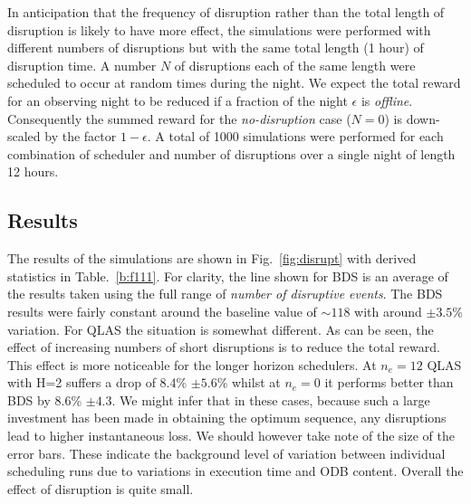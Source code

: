 In anticipation that the frequency of disruption rather than the total length of disruption is likely to have more effect, the simulations were performed with different numbers of disruptions but with the same total length (1 hour) of disruption time. A number $N$ of disruptions each of the same length were scheduled to occur at random times during the night. We expect the total reward for an observing night to be reduced if a fraction of the night $\epsilon$ is \emph{offline}. Consequently the summed reward for the \emph{no-disruption} case ($N = 0$) is down-scaled by the factor $1-\epsilon$. A total of 1000 simulations were performed for each combination of scheduler and number of disruptions over a single night of length 12 hours.

\subsection{Results}
The results of the simulations are shown in Fig.~\ref{fig:disrupt} with derived statistics in Table.~\ref{b:f111}. For clarity, the line shown for BDS is an average of the results taken using the full range of \emph{number of disruptive events}. The BDS results were fairly constant around the baseline value of $\sim 118$ with around $\pm 3.5$\% variation. For QLAS the situation is somewhat different. As can be seen, the effect of increasing numbers of short disruptions is to reduce the total reward. This effect is more noticeable for the longer horizon schedulers. At $n_e=12$ QLAS with H=2 suffers a drop of 8.4\% $\pm 5.6$\% whilst at $n_e=0$ it performs better than BDS by 8.6\% $\pm 4.3$. We might infer that in these cases, because such a large investment has been made in obtaining the optimum sequence, any disruptions lead to higher instantaneous loss. We should however take note of the size of the error bars. These indicate the background level of variation between individual scheduling runs due to variations in execution time and ODB content. Overall the effect of disruption is quite small.

